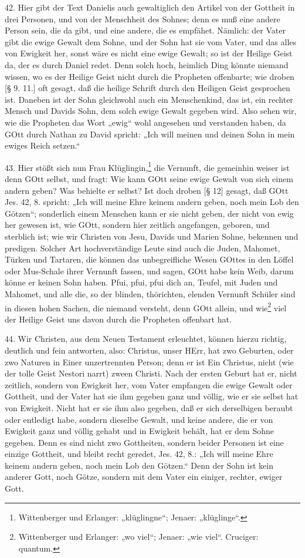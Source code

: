 42. Hier gibt der Text Danielis auch gewaltiglich den Artikel von der Gottheit in drei Personen, und von der Menschheit des Sohnes; denn es muß eine andere Person sein, die da gibt, und eine andere, die es empfähet. Nämlich: der Vater gibt die ewige Gewalt dem Sohne, und der Sohn hat sie vom Vater, und das alles von Ewigkeit her, sonst wäre es nicht eine ewige Gewalt; so ist der Heilige Geist da, der es durch Daniel redet. Denn solch hoch, heimlich Ding könnte niemand wissen, wo es der Heilige Geist nicht durch die Propheten offenbarte; wie droben [§ 9. 11.] oft gesagt, daß die heilige Schrift durch den Heiligen Geist gesprochen ist. Daneben ist der Sohn gleichwohl auch ein Menschenkind, das ist, ein rechter Mensch und Davids Sohn, dem solch ewige Gewalt gegeben wird. Also sehen wir, wie die Propheten das Wort „ewig“ wohl angesehen und verstanden haben, da GOtt durch Nathan zu David spricht: „Ich will meinen und deinen Sohn in mein ewiges Reich setzen.“

43. Hier stößt sich nun Frau Klüglingin,\footnote{Wittenberger und Erlanger: „klüglingne“; Jenaer: „klüglinge“.} die Vernunft, die gemeinhin weiser ist denn GOtt selbst, und fragt: Wie kann GOtt seine ewige Gewalt von sich einem andern geben? Was behielte er selbst? Ist doch droben [§ 12] gesagt, daß GOtt Jes. 42, 8. spricht: „Ich will meine Ehre keinem andern geben, noch mein Lob den Götzen“; sonderlich einem Menschen kann er sie nicht geben, der nicht von ewig her gewesen ist, wie GOtt, sondern hier zeitlich angefangen, geboren, und sterblich ist; wie wir Christen von Jesu, Davids und Marien Sohne, bekennen und predigen. Solcher Art hochverständige Leute sind auch die Juden, Mahomet, Türken und Tartaren, die können das unbegreifliche Wesen GOttes in den Löffel oder Mus-Schale ihrer Vernunft fassen, und sagen, GOtt habe kein Weib, darum könne er keinen Sohn haben. Pfui, pfui, pfui dich an, Teufel, mit Juden und Mahomet, und alle die, so der blinden, thörichten, elenden Vernunft Schüler sind in diesen hohen Sachen, die niemand versteht, denn GOtt allein, und wie\footnote{Wittenberger und Erlanger: „wo viel“; Jenaer: „wie viel“. Cruciger: quantum.} viel der Heilige Geist uns davon durch die Propheten offenbart hat.

44. Wir Christen, aus dem Neuen Testament erleuchtet, können hierzu richtig, deutlich und fein antworten, also: Christus, unser HErr, hat zwo Geburten, oder zwo Naturen in Einer unzertrennten Person; denn er ist Ein Christus, nicht (wie der tolle Geist Nestori narrt) zween Christi. Nach der ersten Geburt hat er, nicht zeitlich, sondern von Ewigkeit her, vom Vater empfangen die ewige Gewalt oder Gottheit, und der Vater hat sie ihm gegeben ganz und völlig, wie er sie selbst hat von Ewigkeit. Nicht hat er sie ihm also gegeben, daß er sich derselbigen beraubt oder entledigt habe, sondern dieselbe Gewalt, und keine andere, die er von Ewigkeit ganz und völlig gehabt und in Ewigkeit behält, hat er dem Sohne gegeben. Denn es sind nicht zwo Gottheiten, sondern beider Personen ist eine einzige Gottheit, und bleibt recht geredet, Jes. 42, 8.: „Ich will meine Ehre keinem andern geben, noch mein Lob den Götzen.“ Denn der Sohn ist kein anderer Gott, noch Götze, sondern mit dem Vater ein einiger, rechter, ewiger Gott.


